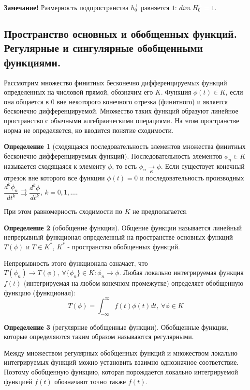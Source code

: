 \documentclass[14pt,a4paper]{extarticle}
\theoremstyle{definition}
\newtheorem{definition}{Определение}[section]
\theoremstyle{remark}
\renewcommand{\[}{\begin{dmath*}[compact]}
\renewcommand{\]}{\end{dmath*}}
\newcommand{\sep}{ , \ \allowbreak }
\newcommand\f[2]{\dfrac{#1}{#2}}
\begin{document}
\textbf{Замечание!} Размерность подпространства $h_0^\bot$ равняется
$1$: $dim\ H_0^\bot = 1$.


\subsection{Пространство основных и обобщенных функций.
Регулярные и сингулярные обобщенными функциями.}

Рассмотрим множество финитных бесконечно дифференцируемых функций
определенных на числовой прямой, обозначим его $K$. Функция $\phi(t) \in K$,
если она общается в $0$ вне некоторого конечного отрезка (финитного) и
является бесконечно дифференцируемой.
Множество таких функций образуют линейное пространство с обычными
алгебраическими операциями.
На этом пространстве норма не определяется, но вводится понятие сходимости.

\begin{definition}[сходящаяся последовательность элементов множества
финитных бесконечно дифференцируемых функций]
  Последовательность элементов $\phi_n \in K$ называется сходящаяся к элементу
  $\phi$, то есть $\phi_n \underset{K}{\to}\phi$.
  Если существует конечный отрезок вне которого все функции $\phi(t)=0$ и
  последовательность производных
  $\f{d^k\phi_n}{dt^k} \rightrightarrows \f{d^k\phi}{dt^k} \sep k=0,1,\dots$.
\end{definition}

При этом равномерность сходимости по $K$ не предполагается.

\begin{definition}[обобщение функции]
  Общение функции называется линейный непрерывный функционал определенный
  на пространстве основных функций $T(\phi)$ и $T \in K^*$,
  $K^*$ - пространство обобщенных функций.
\end{definition}

Непрерывность этого функционала означает,
что $T(\phi_n) \to T(\phi) \sep \forall \{\phi_n\}\in K: \phi_n \to \phi$.
Любая локально интегрируемая функция $f(t)$
(интегрируемая на любом конечном промежутке) определяет
обобщенную функцию (функционал):
\[T(\phi)=\int_{-\infty}^\infty f(t)\phi(t)dt \sep \forall \phi \in K\]

\begin{definition}[регулярние обобщенные функции]
  Обобщенные функции, которые определяются таким образом называются регулярными.
\end{definition}

Между множеством регулярных обобщенных функций и множеством локально интегрируемых
функций можно установить взаимно однозначное соответствие.
Поэтому обобщенную функцию, которая порождается локально интегрируемой
функцией $f(t)$ обозначают точно также $f(t)$.
\end{document}
